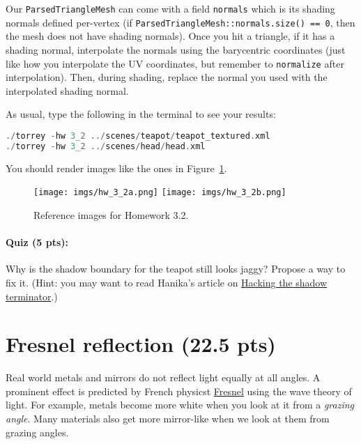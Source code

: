 Our \lstinline{ParsedTriangleMesh} can come with a field \lstinline{normals} which is its shading normals defined per-vertex (if \lstinline{ParsedTriangleMesh::normals.size() == 0}, then the mesh does not have shading normals). Once you hit a triangle, if it has a shading normal, interpolate the normals using the barycentric coordinates (just like how you interpolate the UV coordinates, but remember to \lstinline{normalize} after interpolation). Then, during shading, replace the normal you used with the interpolated shading normal.

As usual, type the following in the terminal to see your results:
\begin{lstlisting}[language=C++]
./torrey -hw 3_2 ../scenes/teapot/teapot_textured.xml
./torrey -hw 3_2 ../scenes/head/head.xml
\end{lstlisting}
You should render images like the ones in Figure~\ref{fig:hw_3_2}.

\begin{figure}[ht]
    \centering
    \texttt{[image: imgs/hw\_3\_2a.png]}
    \texttt{[image: imgs/hw\_3\_2b.png]}
    \caption{Reference images for Homework 3.2.}
    \label{fig:hw_3_2}
\end{figure}

\paragraph{Quiz (5 pts):} Why is the shadow boundary for the teapot still looks jaggy? Propose a way to fix it. (Hint: you may want to read Hanika's article on \href{https://jo.dreggn.org/home/2021_terminator.pdf}{Hacking the shadow terminator}.)

\section{Fresnel reflection (22.5 pts)}
Real world metals and mirrors do not reflect light equally at all angles. A prominent effect is predicted by French physicst \href{https://en.wikipedia.org/wiki/Augustin-Jean_Fresnel}{Fresnel} using the wave theory of light. For example, metals become more white when you look at it from a \emph{grazing angle}. Many materials also get more mirror-like when we look at them from grazing angles.

